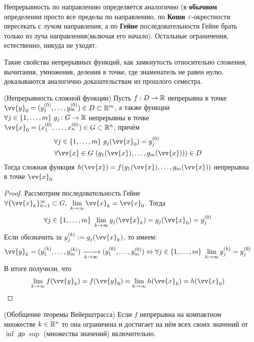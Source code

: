 \begin{note}
	Непрерывность по направлению определяется аналогично (в \textbf{обычном} определении просто все пределы по направлению, по \textbf{Коши} $\varepsilon$-окрестности пересекать с лучом направления, а по \textbf{Гейне} последовательности Гейне брать только из луча направления(включая его начало). Остальные ограничения, естественно, никуда не уходят.
\end{note}

\begin{note}
	Такие свойства непрерывных функций, как замкнутость относительно сложения, вычитания, умножения, деления в точке, где знаменатель не равен нулю, доказываются аналогично доказательствам из прошлого семестра.
\end{note}

\begin{theorem} (Непрерывность сложной функции)
	Пусть $f: D \to \mathbb{R}$ непрерывна в точке $\vv{y}_0 = (y_1^{(0)}, \ldots, y_m^{(0)}) \in D \subset \R^m$, а также функции $\forall j \in \{1, \ldots, m\}\ g_j \colon G \to \mathbb{R}$ непрерывны в точке $\vv{x}_0 = (x_1^{(0)}, \ldots, x_n^{(0)}) \in G \subset \R^n$, причём
	\begin{align*}
		&{\forall j \in \range{m}\ g_j(\vv{x}_0) = y_j^{(0)}}
		\\
		&{\forall \vv{x} \in G\ (g_1(\vv{x}), \ldots, g_m(\vv{x}))) \in D}
	\end{align*}
	Тогда сложная функция $h(\vv{x}) = f(g_1(\vv{x}), \ldots, g_m(\vv{x}))$ непрерывна в точке $\vv{x}_0$
\end{theorem}

\begin{proof}
	Рассмотрим последовательность Гейне $\forall \{\vv{x}_k\}_{k = 1}^\infty \subset G,\ \liml_{k \to \infty} \vv{x}_k = \vv{x}_0$. Тогда
	\[
		\forall j \in \range{m}\ \liml_{k \to \infty} g_j(\vv{x}_k) = g_j(\vv{x}_0) = y_j^{(0)}
	\]
	Если обозначить за $y_j^{(k)} := g_j(\vv{x}_k)$, то имеем:
	\[
		\vv{y}_k = (y_1^{(k)}, \ldots, y_m^{(k)}) \xrightarrow[k \to \infty]{} (y_1^{(0)}, \ldots, y_m^{(0)}) \lra \forall j \in \range{m}\ \liml_{k \to \infty} y_j^{(k)} = y_j^{(0)}
	\]
	В итоге получили, что
	\[
		\liml_{k \to \infty} f(\vv{y}_k) = f(\vv{y}_0) = \liml_{k \to \infty} h(\vv{x}_k) = h(\vv{x}_0)
	\]
\end{proof}

\begin{theorem}
	(Обобщение теоремы Вейерштрасса) Если $f$ непрерывна на компактном множестве $k \in \mathbb{R}^n$ то она ограничена и достигает на нём всех своих значений от $\inf$ до $\sup$ (множества значений) включительно. 
\end{theorem}

